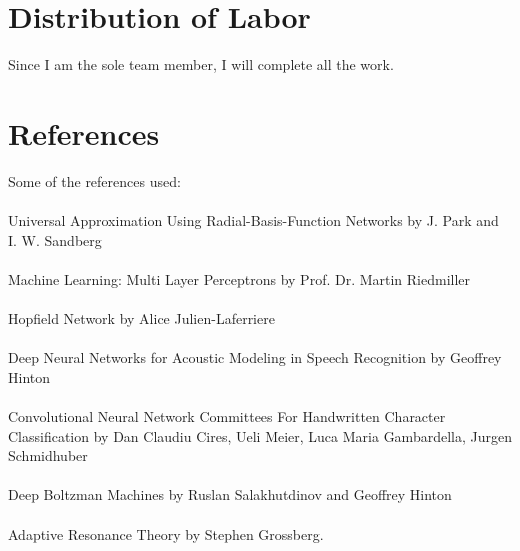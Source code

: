 \documentclass[paper=a4, fontsize=11pt]{scrartcl} %
\numberwithin{equation}{section} %
\numberwithin{figure}{section} %
\numberwithin{table}{section} %
\begin{document}
	\section{Distribution of Labor}
	Since I am the sole team member, I will complete all the work.
	
	\section{References}
	
	Some of the references used:
	\\\\
	Universal Approximation Using Radial-Basis-Function Networks by J. Park and I. W. Sandberg
	\\\\
	Machine Learning: Multi Layer Perceptrons by Prof. Dr. Martin Riedmiller
	\\\\
	Hopfield Network by Alice Julien-Laferriere
	\\\\
	Deep Neural Networks for Acoustic Modeling in Speech Recognition by Geoffrey Hinton
	\\\\
	Convolutional Neural Network Committees For Handwritten Character
	Classification by Dan Claudiu Cires, Ueli Meier, Luca Maria Gambardella, Jurgen Schmidhuber
	\\\\
	Deep Boltzman Machines by Ruslan Salakhutdinov and Geoffrey Hinton
	\\\\	
	Adaptive Resonance Theory by Stephen Grossberg.
	
	
	
\end{document}
